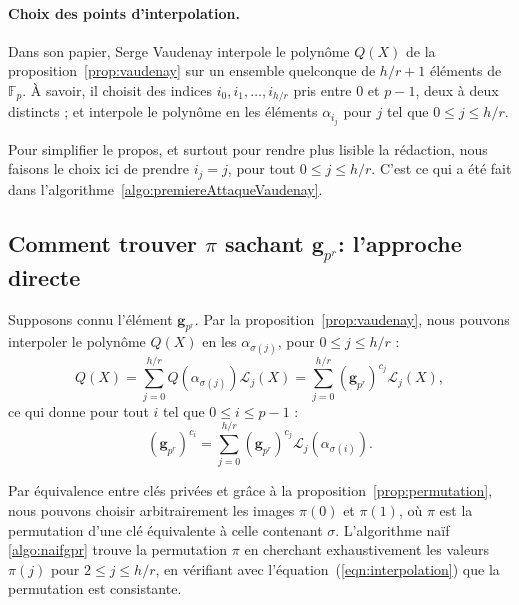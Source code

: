 \documentclass[a4paper, titlepage, 11pt]{article}
\theoremstyle{definition}
\theoremstyle{remark}
\def\gf #1{\mathbb{F}_{#1}}
\def\mbf #1{\mathbf{#1}}
\begin{document}
\paragraph{Choix des points d'interpolation.}

Dans son papier, Serge Vaudenay interpole le polynôme $Q(X)$ de la proposition~\ref{prop:vaudenay} sur un ensemble quelconque de $h/r+1$ éléments de $\gf{p}$. À savoir, il choisit des indices $i_0, i_1, \dots, i_{h/r}$ pris entre $0$ et $p-1$, deux à deux distincts ; et interpole le polynôme en les éléments $\alpha_{i_j}$ pour $j$ tel que $0 \leqslant j \leqslant h/r$.

Pour simplifier le propos, et surtout pour rendre plus lisible la rédaction, nous faisons le choix ici de prendre $i_j = j$, pour tout $0 \leqslant j \leqslant h/r$. C'est ce qui a été fait dans l'algorithme~\ref{algo:premiereAttaqueVaudenay}.

\subsection{Comment trouver $\pi$ sachant $\mbf g_{p^r}$: l'approche directe}

Supposons connu l'élément $\mbf g_{p^r}$. Par la proposition~\ref{prop:vaudenay}, nous pouvons interpoler le polynôme $Q(X)$ en les $\alpha_{\sigma(j)}$, pour $0 \leqslant j \leqslant h/r$ :
$$ Q(X) = \sum_{j=0}^{h/r} Q\left(\alpha_{\sigma(j)}\right) \mathcal L_j(X) = \sum_{j=0}^{h/r} (\mbf g_{p^r})^{c_{j}} \mathcal L_j(X),$$
ce qui donne pour tout $i$ tel que $0\leqslant i \leqslant p-1$ :
\begin{equation}\label{eqn:interpolation}
(\mbf g_{p^r})^{c_i} = \sum_{j=0}^{h/r} (\mbf g_{p^r})^{c_{j}} \mathcal L_j(\alpha_{\sigma(i)}).
\end{equation}

Par équivalence entre clés privées et grâce à la proposition~\ref{prop:permutation}, nous pouvons choisir arbitrairement les images $\pi(0)$ et $\pi(1)$, où $\pi$ est la permutation d'une clé équivalente à celle contenant $\sigma$. L'algorithme naïf \ref{algo:naifgpr} trouve la permutation $\pi$ en cherchant exhaustivement les valeurs $\pi(j)$ pour $2\leqslant j \leqslant h/r$, en vérifiant avec l'équation~(\ref{eqn:interpolation}) que la permutation est consistante.
\end{document}
